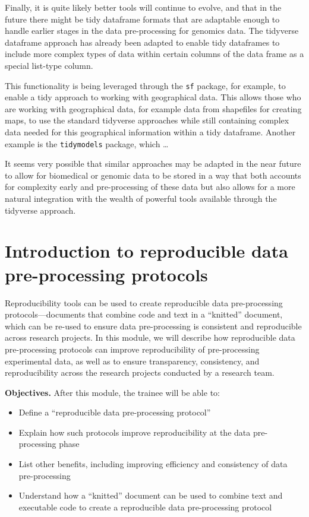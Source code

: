 \documentclass[]{tufte-book}
\providecommand{\tightlist}{%
  \setlength{\itemsep}{0pt}\setlength{\parskip}{0pt}}
\begin{document}
Finally, it is quite likely better tools will continue to evolve, and that in
the future there might be tidy dataframe formats that are adaptable enough to
handle earlier stages in the data pre-processing for genomics data. The tidyverse
dataframe approach has already been adapted to enable tidy dataframes to include
more complex types of data within certain columns of the data frame as a special
list-type column.

This functionality is being leveraged through the \texttt{sf}
package, for example, to enable a tidy approach to working with geographical
data. This allows those who are working with geographical data, for example data
from shapefiles for creating maps, to use the standard tidyverse approaches
while still containing complex data needed for this geographical information
within a tidy dataframe. Another example is the \texttt{tidymodels} package, which \ldots{}

It seems very possible that similar approaches may be adapted in the near future
to allow for biomedical or genomic data to be stored in a way that both accounts
for complexity early and pre-processing of these data but also allows for a more
natural integration with the wealth of powerful tools available through the
tidyverse approach.

\section{Introduction to reproducible data pre-processing protocols}\label{module18}

Reproducibility tools can be used to create reproducible data pre-processing
protocols---documents that combine code and text in a ``knitted'' document, which
can be re-used to ensure data pre-processing is consistent and reproducible
across research projects. In this module, we will describe how reproducible data
pre-processing protocols can improve reproducibility of pre-processing
experimental data, as well as to ensure transparency, consistency, and
reproducibility across the research projects conducted by a research team.

\textbf{Objectives.} After this module, the trainee will be able to:

\begin{itemize}
\tightlist
\item
  Define a ``reproducible data pre-processing protocol''
\item
  Explain how such protocols improve reproducibility at the data pre-processing
  phase
\item
  List other benefits, including improving efficiency and consistency of data
  pre-processing
\item
  Understand how a ``knitted'' document can be used to combine text and
  executable code to create a reproducible data pre-processing protocol
\end{itemize}
\end{document}

